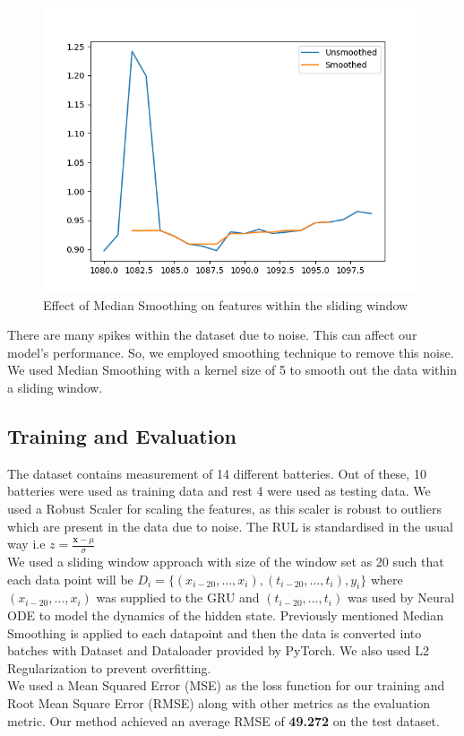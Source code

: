 \documentclass[12pt]{article}
\begin{document}
\begin{figure}[h]
\begin{minipage}{0.32\textwidth}
				\end{minipage}
				\hfill
				\begin{minipage}{0.32\textwidth}
					\centering
					\includegraphics[width=\textwidth]{imgs/smoothing_3.png}
				\end{minipage}
				\caption{Effect of Median Smoothing on features within the sliding window}
				\label{fig:three_plots}
			\end{figure}
			\footnotesize{There are many spikes within the dataset due to noise. This can affect our model's performance. So, we employed smoothing technique to remove this noise. We used Median Smoothing with a kernel size of 5 to smooth out the data within a sliding window.}
		\subsection{Training and Evaluation}
		The dataset contains measurement of 14 different batteries. Out of these, 10 batteries were used as training data and rest 4 were used as testing data. We used a Robust Scaler for scaling the features, as this scaler is robust to outliers which are present in the data due to noise. The RUL is standardised in the usual way i.e $z = \frac{\mathbf{x} - \mu}{\sigma}$
		\\
		We used a sliding window approach with size of the window set as 20 such that each data point will be $D_i = \{(x_{i-20}, \dots, x_i), (t_{i-20}, \dots, t_i), y_i\}$ where $(x_{i-20}, \dots, x_i)$ was supplied to the GRU and $(t_{i-20}, \dots, t_i)$ was used by Neural ODE to model the dynamics of the hidden state. Previously mentioned Median Smoothing is applied to each datapoint and then the data is converted into batches with Dataset and Dataloader provided by PyTorch. We also used L2 Regularization to prevent overfitting.
		\\
		\footnotesize{We used a Mean Squared Error (MSE) as the loss function for our training and Root Mean Square Error (RMSE) along with other metrics as the evaluation metric.}
		Our method achieved an average RMSE of \textbf{49.272} on the test dataset.
		
\end{document}
